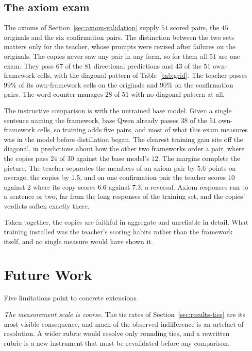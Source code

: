 \documentclass[10pt,twocolumn,a4paper]{article}
\begin{document}
\subsection{The axiom exam}

The axioms of Section~\ref{sec:axiom-validation} supply $51$ scored
pairs, the $45$ originals and the six confirmation pairs. The
distinction between the two sets matters only for the teacher, whose
prompts were revised after failures on the originals. The copies never
saw any pair in any form, so for them all $51$ are one exam. They pass
$67$ of the $81$ directional predictions and $43$ of the $51$
own-framework cells, with the diagonal pattern of Table~\ref{tab:grid}.
The teacher passes $99\%$ of its own-framework cells on the originals
and $90\%$ on the confirmation pairs. The word counter manages $28$ of
$51$ with no diagonal pattern at all.

The instructive comparison is with the untrained base model. Given a
single sentence naming the framework, base Qwen already passes $38$ of
the $51$ own-framework cells, so training adds five pairs, and most of
what this exam measures was in the model before distillation began. The
clearest training gain sits off the diagonal, in predictions about how
the other two frameworks order a pair, where the copies pass $24$ of
$30$ against the base model's $12$. The margins complete the picture.
The teacher separates the members of an axiom pair by $5.6$ points on
average, the copies by $1.5$, and on one confirmation pair the teacher
scores $10$ against $2$ where its copy scores $6.6$ against $7.3$, a
reversal. Axiom responses run to a sentence or two, far from the long
responses of the training set, and the copies' verdicts soften exactly
there.

Taken together, the copies are faithful in aggregate and unreliable in
detail. What training installed was the teacher's scoring habits rather
than the framework itself, and no single measure would have shown it.

\section{Future Work}
\label{sec:future}

Five limitations point to concrete extensions.

\emph{The measurement scale is coarse.} The tie rates of
Section~\ref{sec:results-ties} are its most visible consequence, and
much of the observed indifference is an artefact of resolution. A wider
rubric would resolve only rounding ties, and a rewritten rubric is a
new instrument that must be revalidated before any comparison.
\end{document}
